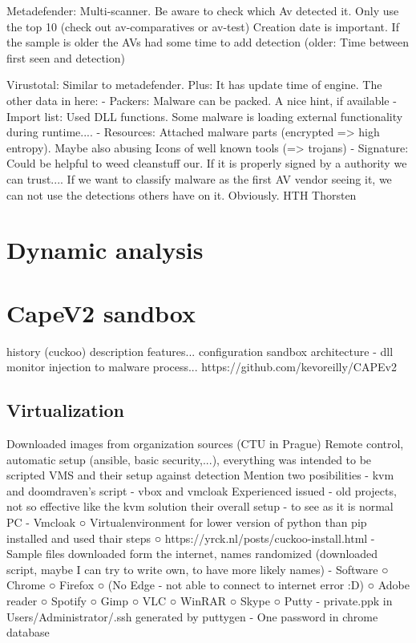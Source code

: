Metadefender:
Multi-scanner. Be aware to check which Av detected it. Only use the top 10 (check out av-comparatives or av-test)
Creation date is important. If the sample is older the AVs had some time to add detection (older: Time between first seen and detection)


Virustotal:
Similar to metadefender. Plus: It has update time of engine.
The other data in here:
- Packers: Malware can be packed. A nice hint, if available
- Import list: Used DLL functions. Some malware is loading external functionality during runtime....
- Resources: Attached malware parts (encrypted => high entropy). Maybe also abusing Icons of well known tools (=> trojans)
- Signature: Could be helpful to weed cleanstuff our. If it is properly signed by a authority we can trust....
If we want to classify malware as the first AV vendor seeing it, we can not use the detections others have on it. Obviously.
HTH
Thorsten

\section{Dynamic analysis}
\section{CapeV2 sandbox}
history (cuckoo)
description
    features...
configuration
sandbox architecture - dll monitor injection to malware process...
https://github.com/kevoreilly/CAPEv2

\subsection{Virtualization}
Downloaded images from organization sources (CTU in Prague)
Remote control, automatic setup (ansible, basic security,...), everything was intended to be scripted
VMS and their setup against detection
Mention two posibilities
    - kvm and doomdraven's script
    - vbox and vmcloak
        Experienced issued - old projects, not so effective like the kvm solution
their overall setup - to see as it is normal PC
    - Vmcloak
    ○ Virtualenvironment for lower version of python than pip installed and used thair steps
    ○ https://yrck.nl/posts/cuckoo-install.html
    - Sample files downloaded form the internet, names randomized (downloaded script, maybe I can try to write own, to have more likely names)
    - Software
    ○ Chrome
    ○ Firefox
    ○ (No Edge - not able to connect to internet error :D)
    ○ Adobe reader
    ○ Spotify
    ○ Gimp
    ○ VLC
    ○ WinRAR
    ○ Skype
    ○ Putty
    - private.ppk in Users/Administrator/.ssh generated by puttygen
    - One password in chrome database
